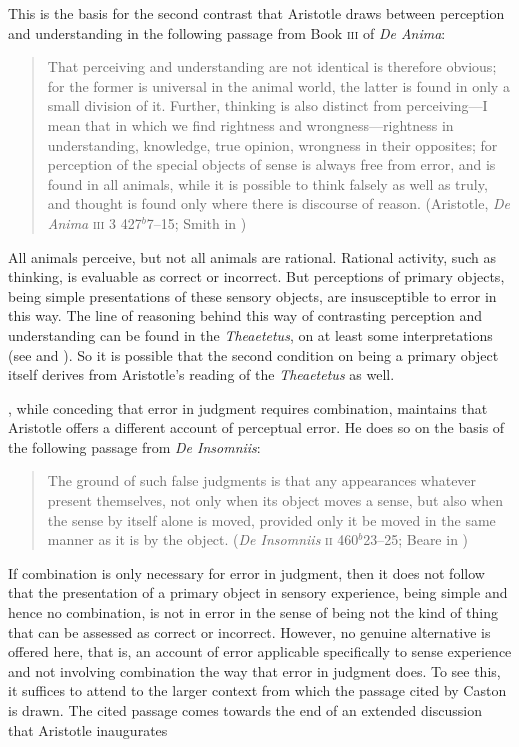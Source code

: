 This is the basis for the second contrast that Aristotle draws between perception and understanding in the following passage from Book \textsc{iii} of \emph{De Anima}:
\begin{quote}
	That perceiving and understanding are not identical is therefore obvious; for the former is universal in the animal world, the latter is found in only a small division of it. Further, thinking is also distinct from perceiving---I mean that in which we find rightness and wrongness---right\-ness in understanding, knowledge, true opinion, wrongness in their opposites; for perception of the special objects of sense is always free from error, and is found in all animals, while it is possible to think falsely as well as truly, and thought is found only where there is discourse of reason. (Aristotle, \emph{De Anima} \textsc{iii} 3 427\( ^{b} \)7--15; Smith in \citealt[49]{Barnes:1984uq})
\end{quote}
All animals perceive, but not all animals are rational. Rational activity, such as thinking, is evaluable as correct or incorrect. But perceptions of primary objects, being simple presentations of these sensory objects, are insusceptible to error in this way. The line of reasoning behind this way of contrasting perception and understanding can be found in the \emph{Theaetetus}, on at least some interpretations (see \citealt{Cooper:1970kx} and \citealt{Burnyeat:1990dp}). So it is possible that the second condition on being a primary object itself derives from Aristotle's reading of the \emph{Theaetetus} as well.

\citet{Caston:1998nx}, while conceding that error in judgment requires combination, maintains that Aristotle offers a different account of perceptual error. He does so on the basis of the following passage from \emph{De Insomniis}:
\begin{quote}
	The ground of such false judgments is that any appearances whatever present themselves, not only when its object moves a sense, but also when the sense by itself alone is moved, provided only it be moved in the same manner as it is by the object. (\emph{De Insomniis} \textsc{ii} 460\( ^{b} \)23--25; Beare in \citealt[6]{Barnes:1984uq})
\end{quote}
If combination is only necessary for error in judgment, then it does not follow that the presentation of a primary object in sensory experience, being simple and hence no combination, is not in error in the sense of being not the kind of thing that can be assessed as correct or incorrect. However, no genuine alternative is offered here, that is, an account of error applicable specifically to sense experience and not involving combination the way that error in judgment does. To see this, it suffices to attend to the larger context from which the passage cited by Caston is drawn. The cited passage comes towards the end of an extended discussion that Aristotle inaugurates

